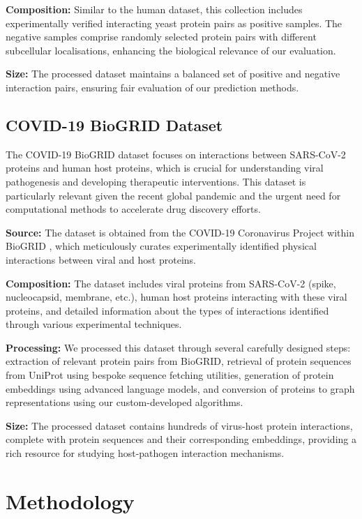 \documentclass[12pt,a4paper]{article}
\begin{document}
\textbf{Composition:} Similar to the human dataset, this collection includes experimentally verified interacting yeast protein pairs as positive samples. The negative samples comprise randomly selected protein pairs with different subcellular localisations, enhancing the biological relevance of our evaluation.

\textbf{Size:} The processed dataset maintains a balanced set of positive and negative interaction pairs, ensuring fair evaluation of our prediction methods.

\subsection{COVID-19 BioGRID Dataset}

The COVID-19 BioGRID dataset focuses on interactions between SARS-CoV-2 proteins and human host proteins, which is crucial for understanding viral pathogenesis and developing therapeutic interventions. This dataset is particularly relevant given the recent global pandemic and the urgent need for computational methods to accelerate drug discovery efforts.

\textbf{Source:} The dataset is obtained from the COVID-19 Coronavirus Project within BioGRID \cite{oughtred2021biogrid}, which meticulously curates experimentally identified physical interactions between viral and host proteins.

\textbf{Composition:} The dataset includes viral proteins from SARS-CoV-2 (spike, nucleocapsid, membrane, etc.), human host proteins interacting with these viral proteins, and detailed information about the types of interactions identified through various experimental techniques.

\textbf{Processing:} We processed this dataset through several carefully designed steps: extraction of relevant protein pairs from BioGRID, retrieval of protein sequences from UniProt using bespoke sequence fetching utilities, generation of protein embeddings using advanced language models, and conversion of proteins to graph representations using our custom-developed algorithms.

\textbf{Size:} The processed dataset contains hundreds of virus-host protein interactions, complete with protein sequences and their corresponding embeddings, providing a rich resource for studying host-pathogen interaction mechanisms.

\section{Methodology}
\label{sec:methodology}
\end{document}
